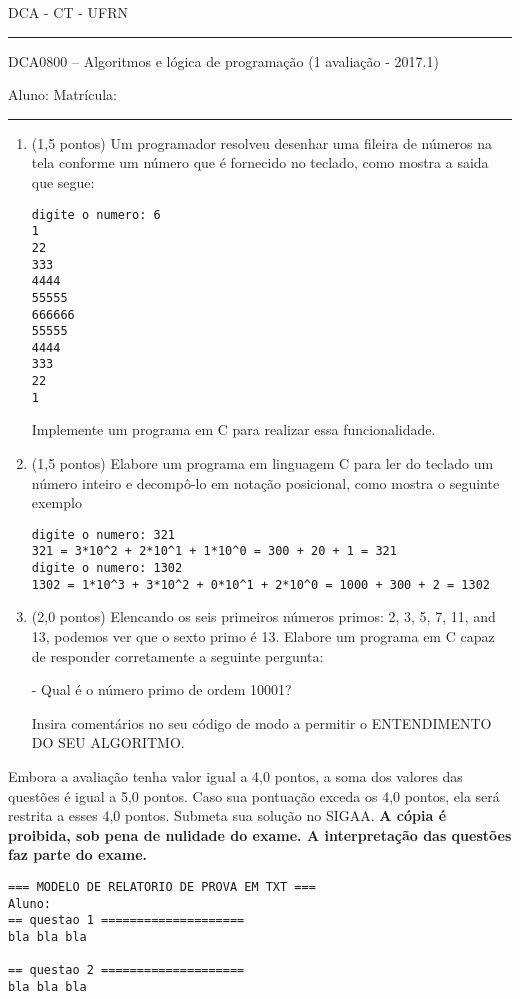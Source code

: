 \documentclass[12pt,a4paper]{article}
\begin{document}
\begin{center}\scshape
  DCA - CT - UFRN
\rule{\linewidth}{1pt}
\end{center}
 
\begin{center}\Large
DCA0800 -- Algoritmos e lógica de programação (1\raisebox{0.5ex}{\small a} avaliação - 2017.1)\\
\end{center}
\noindent Aluno:\hrulefill \vspace{2mm} Matrícula: \rule{2.5cm}{0.4pt}

\begin{enumerate}

\item (1,5 pontos) Um programador resolveu desenhar uma fileira de
  números na tela conforme um número que é fornecido no teclado, como
  mostra a saida que segue:
\begin{verbatim}
digite o numero: 6
1
22
333
4444
55555
666666
55555
4444
333
22
1
\end{verbatim}

Implemente um programa em C para realizar essa funcionalidade.

\item (1,5 pontos) Elabore um programa em linguagem C para ler do teclado um número
  inteiro e decompô-lo em notação posicional, como mostra o seguinte exemplo
\begin{verbatim}
digite o numero: 321
321 = 3*10^2 + 2*10^1 + 1*10^0 = 300 + 20 + 1 = 321
digite o numero: 1302
1302 = 1*10^3 + 3*10^2 + 0*10^1 + 2*10^0 = 1000 + 300 + 2 = 1302
\end{verbatim}

\item (2,0 pontos) Elencando os seis primeiros números primos: 2, 3,
  5, 7, 11, and 13, podemos ver que o sexto primo é 13.  Elabore um
  programa em C capaz de responder corretamente a seguinte pergunta:

  - Qual é o número primo de ordem 10001?

  Insira comentários no seu código de modo a permitir o ENTENDIMENTO
  DO SEU ALGORITMO.
\end{enumerate}

Embora a avaliação tenha valor igual a 4,0 pontos, a soma dos valores
das questões é igual a 5,0 pontos. Caso sua pontuação exceda os 4,0
pontos, ela será restrita a esses 4,0 pontos.  Submeta sua solução no
SIGAA. {\bf A cópia é proibida, sob pena de nulidade do exame. A
  interpretação das questões faz parte do exame.}
\begin{verbatim}
=== MODELO DE RELATORIO DE PROVA EM TXT ===
Aluno:
== questao 1 ====================
bla bla bla

== questao 2 ====================
bla bla bla
\end{verbatim}
\end{document}
